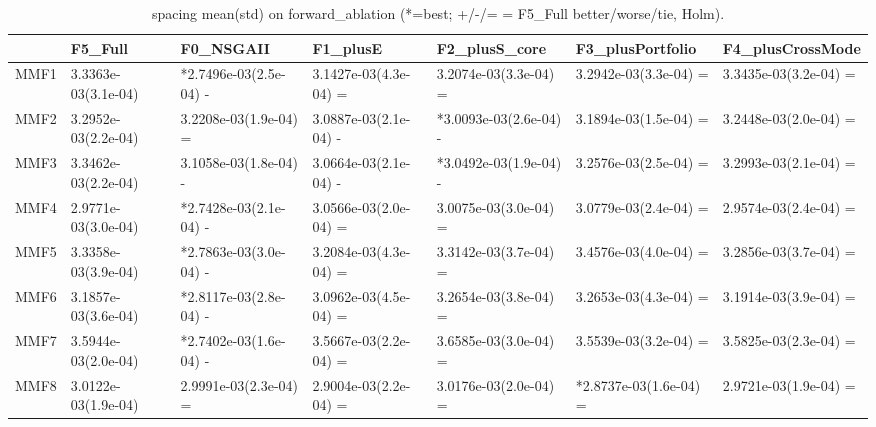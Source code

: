 \begin{table}[t]
\centering
\caption{spacing mean(std) on forward_ablation (*=best; +/-/= = F5_Full better/worse/tie, Holm).}
\label{tab:forward_ablation_spacing}
\begin{tabular}{lllllll}
\toprule
 & F5\_Full & F0\_NSGAII & F1\_plusE & F2\_plusS\_core & F3\_plusPortfolio & F4\_plusCrossMode \\
\midrule
MMF1 & 3.3363e-03(3.1e-04) & *2.7496e-03(2.5e-04) - & 3.1427e-03(4.3e-04) = & 3.2074e-03(3.3e-04) = & 3.2942e-03(3.3e-04) = & 3.3435e-03(3.2e-04) = \\
MMF2 & 3.2952e-03(2.2e-04) & 3.2208e-03(1.9e-04) = & 3.0887e-03(2.1e-04) - & *3.0093e-03(2.6e-04) - & 3.1894e-03(1.5e-04) = & 3.2448e-03(2.0e-04) = \\
MMF3 & 3.3462e-03(2.2e-04) & 3.1058e-03(1.8e-04) - & 3.0664e-03(2.1e-04) - & *3.0492e-03(1.9e-04) - & 3.2576e-03(2.5e-04) = & 3.2993e-03(2.1e-04) = \\
MMF4 & 2.9771e-03(3.0e-04) & *2.7428e-03(2.1e-04) - & 3.0566e-03(2.0e-04) = & 3.0075e-03(3.0e-04) = & 3.0779e-03(2.4e-04) = & 2.9574e-03(2.4e-04) = \\
MMF5 & 3.3358e-03(3.9e-04) & *2.7863e-03(3.0e-04) - & 3.2084e-03(4.3e-04) = & 3.3142e-03(3.7e-04) = & 3.4576e-03(4.0e-04) = & 3.2856e-03(3.7e-04) = \\
MMF6 & 3.1857e-03(3.6e-04) & *2.8117e-03(2.8e-04) - & 3.0962e-03(4.5e-04) = & 3.2654e-03(3.8e-04) = & 3.2653e-03(4.3e-04) = & 3.1914e-03(3.9e-04) = \\
MMF7 & 3.5944e-03(2.0e-04) & *2.7402e-03(1.6e-04) - & 3.5667e-03(2.2e-04) = & 3.6585e-03(3.0e-04) = & 3.5539e-03(3.2e-04) = & 3.5825e-03(2.3e-04) = \\
MMF8 & 3.0122e-03(1.9e-04) & 2.9991e-03(2.3e-04) = & 2.9004e-03(2.2e-04) = & 3.0176e-03(2.0e-04) = & *2.8737e-03(1.6e-04) = & 2.9721e-03(1.9e-04) = \\
\bottomrule
\end{tabular}
\end{table}
